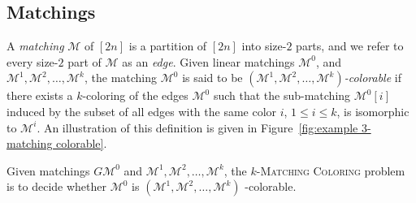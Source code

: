 \subsection*{\textbf{Matchings}}

A \emph{matching} $\mathcal{M}$ of $[2n]$ is a partition of $[2n]$ into size-$2$ parts,
and we refer to every size-$2$ part of $\mathcal{M}$ as an \emph{edge}.
Given linear matchings $\mathcal{M}^0$, and $\mathcal{M}^1, \mathcal{M}^2, \dots, \mathcal{M}^k$,
the matching $\mathcal{M}^0$ is said to be
\emph{$(\mathcal{M}^1, \mathcal{M}^2, \ldots, \mathcal{M}^k)$-colorable}
if there exists a $k$-coloring of the edges $\mathcal{M}^0$ such that
the sub-matching $\mathcal{M}^0[i]$ induced by the subset of all edges with the
same color $i$, $1 \leq i \leq k$, is isomorphic to $\mathcal{M}^i$.
An illustration of this definition is given in
Figure~\ref{fig:example 3-matching colorable}.

Given matchings $G\mathcal{M}^0$ and $\mathcal{M}^1, \mathcal{M}^2, \ldots, \mathcal{M}^k$,
the \textsc{$k$-Matching Coloring} problem is to decide whether $\mathcal{M}^0$
is $(\mathcal{M}^1, \mathcal{M}^2, \ldots, \mathcal{M}^k)$ -colorable.



